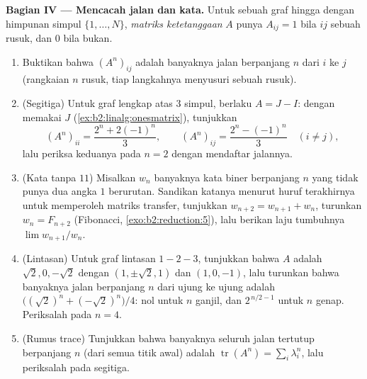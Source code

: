 \begin{problem}
\medskip
\noindent\textbf{Bagian IV --- Mencacah jalan dan kata.} Untuk
sebuah graf hingga dengan himpunan simpul $\{1, \dots, N\}$,
\emph{matriks ketetanggaan} $A$ punya $A_{ij} = 1$ bila $ij$ sebuah rusuk,
dan $0$ bila bukan.
\begin{enumerate}[resume]
  \item Buktikan bahwa $(A^n)_{ij}$ adalah banyaknya jalan berpanjang
        $n$ dari $i$ ke $j$ (rangkaian $n$ rusuk, tiap langkahnya
        menyusuri sebuah rusuk).
  \item (Segitiga) Untuk graf lengkap atas $3$ simpul, berlaku
        $A = J - I$: dengan memakai  $J$
        (\cref{ex:b2:linalg:onesmatrix}), tunjukkan
        \[
        (A^n)_{ii} = \frac{2^n + 2(-1)^n}{3},
        \qquad
        (A^n)_{ij} = \frac{2^n - (-1)^n}{3} \quad (i \neq j),
        \]
        lalu periksa keduanya pada $n = 2$ dengan mendaftar jalannya.
  \item (Kata tanpa $11$) Misalkan $w_n$ banyaknya kata biner
        berpanjang $n$ yang tidak punya dua angka $1$ berurutan.
        Sandikan katanya menurut huruf terakhirnya untuk memperoleh
        matriks transfer, tunjukkan $w_{n+2} = w_{n+1} + w_n$, turunkan $w_n =
        F_{n+2}$ (Fibonacci, \cref{exo:b2:reduction:5}), lalu
        berikan laju tumbuhnya $\lim w_{n+1}/w_n$.
  \item (Lintasan) Untuk graf lintasan $1 - 2 - 3$, tunjukkan bahwa
         $A$ adalah $\sqrt2, 0, -\sqrt2$ dengan
         $(1, \pm\sqrt2, 1)$ dan $(1, 0, -1)$, lalu
        turunkan bahwa banyaknya jalan berpanjang $n$ dari ujung
        ke ujung adalah $\bigl((\sqrt2)^n + (-\sqrt2)^n\bigr)/4$:
        nol untuk $n$ ganjil, dan $2^{\,n/2 - 1}$ untuk $n$ genap.
        Periksalah pada $n = 4$.
  \item (Rumus trace) Tunjukkan bahwa banyaknya seluruh jalan
        tertutup berpanjang $n$ (dari semua titik awal) adalah
        $\operatorname{tr}(A^n) = \sum_i \lambda_i^n$, lalu
        periksalah pada segitiga.
\end{enumerate}


\end{problem}
